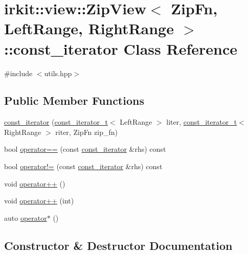 \hypertarget{classirkit_1_1view_1_1ZipView_1_1const__iterator}{}\section{irkit\+:\+:view\+:\+:Zip\+View$<$ Zip\+Fn, Left\+Range, Right\+Range $>$\+:\+:const\+\_\+iterator Class Reference}
\label{classirkit_1_1view_1_1ZipView_1_1const__iterator}


{\ttfamily \#include $<$utils.\+hpp$>$}

\subsection*{Public Member Functions}
\begin{DoxyCompactItemize}
\item 
\hyperlink{classirkit_1_1view_1_1ZipView_1_1const__iterator_a92caec773c73fe7720f274fdb4d14444}{const\+\_\+iterator} (\hyperlink{namespaceirkit_a4b1668583041117eb42c1b5a1091b804}{const\+\_\+iterator\+\_\+t}$<$ Left\+Range $>$ liter, \hyperlink{namespaceirkit_a4b1668583041117eb42c1b5a1091b804}{const\+\_\+iterator\+\_\+t}$<$ Right\+Range $>$ riter, Zip\+Fn zip\+\_\+fn)
\item 
bool \hyperlink{classirkit_1_1view_1_1ZipView_1_1const__iterator_a7cd1982ce6b7a658c69eca8ec3b211c1}{operator==} (const \hyperlink{classirkit_1_1view_1_1ZipView_1_1const__iterator}{const\+\_\+iterator} \&rhs) const
\item 
bool \hyperlink{classirkit_1_1view_1_1ZipView_1_1const__iterator_a64c38c56be6d9bbe7486b97f651c38d4}{operator!=} (const \hyperlink{classirkit_1_1view_1_1ZipView_1_1const__iterator}{const\+\_\+iterator} \&rhs) const
\item 
void \hyperlink{classirkit_1_1view_1_1ZipView_1_1const__iterator_afa50a93c355dff998a3872ead97c29d7}{operator++} ()
\item 
void \hyperlink{classirkit_1_1view_1_1ZipView_1_1const__iterator_a47598d8f9f86eabb28576be721c15d4a}{operator++} (int)
\item 
auto \hyperlink{classirkit_1_1view_1_1ZipView_1_1const__iterator_ae8a7914b8e3d6a1a0bbff1046708acd5}{operator$\ast$} ()
\end{DoxyCompactItemize}


\subsection{Constructor \& Destructor Documentation}
\mbox{\label{classirkit_1_1view_1_1ZipView_1_1const__iterator_a92caec773c73fe7720f274fdb4d14444}} 
